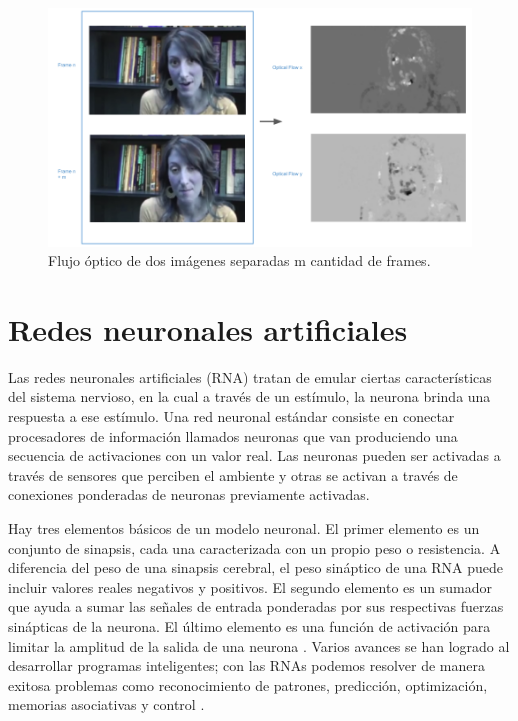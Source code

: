 \begin{onehalfspacing}
\begin{figure}[th]
	\centering
	\includegraphics[width=14cm,keepaspectratio]{XX_Figures/Fig_OpticalFlow.png}
	\caption{\footnotesize Flujo óptico de dos imágenes separadas m cantidad de frames.}
	\label{fig:Fig_OpticalFlow}
\end{figure}

\section{Redes neuronales artificiales}
\label{RNA}
Las redes neuronales artificiales (RNA) tratan de emular ciertas características del sistema nervioso, en la cual a través de un estímulo, la neurona brinda una respuesta a ese estímulo. \cite{Chernyatin1968NNDesign} Una red neuronal estándar consiste en conectar procesadores de información llamados neuronas que van produciendo una secuencia de activaciones con un valor real. Las neuronas pueden ser activadas a través de sensores que perciben el ambiente y otras se activan a través de conexiones ponderadas de neuronas previamente activadas. 

Hay tres elementos básicos de un modelo neuronal. El primer elemento es un conjunto de sinapsis, cada una caracterizada con un propio peso o resistencia. A diferencia del peso de una sinapsis cerebral, el peso sináptico de una RNA puede incluir valores reales negativos y positivos. El segundo elemento es un sumador que ayuda a sumar las señales de entrada ponderadas por sus respectivas fuerzas sinápticas de la neurona. El último elemento es una función de activación para limitar la amplitud de la salida de una neurona \cite{Hawkin2014IntriguingFergus}. Varios avances se han logrado al desarrollar programas inteligentes; con las RNAs podemos resolver de manera exitosa problemas como reconocimiento de patrones, predicción, optimización, memorias asociativas y control \cite{Majumder2015ArtificialNetwork}.
	

\end{onehalfspacing}
